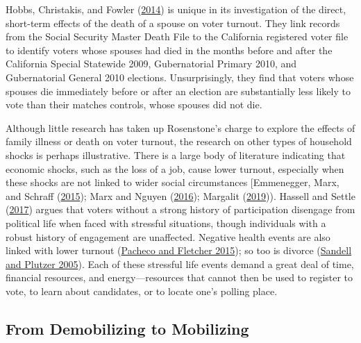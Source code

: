 \documentclass[
  12pt,
]{article}
\begin{document}
Hobbs, Christakis, and Fowler (\protect\hyperlink{ref-Hobbs2014}{2014}) is unique in its investigation of the direct, short-term effects of the death of a spouse on voter turnout. They link records from the Social Security Master Death File to the California registered voter file to identify voters whose spouses had died in the months before and after the California Special Statewide 2009, Gubernatorial Primary 2010, and Gubernatorial General 2010 elections. Unsurprisingly, they find that voters whose spouses die immediately before or after an election are substantially less likely to vote than their matches controls, whose spouses did not die.

Although little research has taken up Rosenstone's charge to explore the effects of family illness or death on voter turnout, the research on other types of household shocks is perhaps illustrative. There is a large body of literature indicating that economic shocks, such as the loss of a job, cause lower turnout, especially when these shocks are not linked to wider social circumstances {[}Emmenegger, Marx, and Schraff (\protect\hyperlink{ref-Emmenegger2015}{2015}); Marx and Nguyen (\protect\hyperlink{ref-Marx2016}{2016}); Margalit (\protect\hyperlink{ref-Margalit2019}{2019})). Hassell and Settle (\protect\hyperlink{ref-Hassell2017}{2017}) argues that voters without a strong history of participation disengage from political life when faced with stressful situations, though individuals with a robust history of engagement are unaffected. Negative health events are also linked with lower turnout (\protect\hyperlink{ref-Pacheco2015}{Pacheco and Fletcher 2015}); so too is divorce (\protect\hyperlink{ref-Sandell2005}{Sandell and Plutzer 2005}). Each of these stressful life events demand a great deal of time, financial resources, and energy---resources that cannot then be used to register to vote, to learn about candidates, or to locate one's polling place.

\hypertarget{from-demobilizing-to-mobilizing}{%
\subsection*{From Demobilizing to Mobilizing}\label{from-demobilizing-to-mobilizing}}
\end{document}
